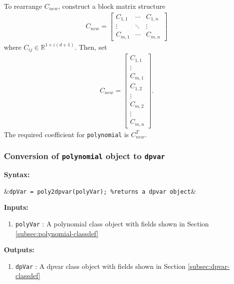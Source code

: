 \documentclass{article}
\newcommand{\bmat}[1]{\begin{bmatrix} #1\end{bmatrix}}
\newcommand{\R}{\mathbb{R}}
\newcommand{\C}{\mathbb{C}}
\begin{document}
	To rearrange $C_{new}$, construct a block matrix structure
	\begin{align*}
		C_{new} = \bmat{C_{1,1}&\cdots&C_{1,n}\\\vdots&\ddots&\vdots\\C_{m,1}&\cdots&C_{m,n}}
	\end{align*}
	where $C_{ij}\in \R^{1\times z(d+1)}$. Then, set
	\begin{align*}
		C_{new} = \bmat{C_{1,1}\\\vdots\\C_{m,1}\\C_{1,2}\\\vdots\\C_{m,2}\\\vdots\\C_{m,n}}.
	\end{align*}
	The required coefficient for \texttt{polynomial} is $C_{new}^T$.
	
	\subsubsection{Conversion of \texttt{polynomial} object to \texttt{dpvar}}\label{subsec:poly2dpvar}
	\textbf{Syntax:}
		\begin{flalign*}
			&\texttt{dpVar = poly2dpvar(polyVar); \%returns a dpvar object}&
		\end{flalign*}
	\textbf{Inputs:}
	\begin{enumerate}
		\item \texttt{polyVar} : A polynomial class object with fields shown in Section \ref{subsec:polynomial-classdef}
	\end{enumerate}
	\textbf{Outputs:}
	\begin{enumerate}
		\item \texttt{dpVar} : A dpvar class object with fields shown in Section \ref{subsec:dpvar-classdef}
	\end{enumerate}
\end{document}
